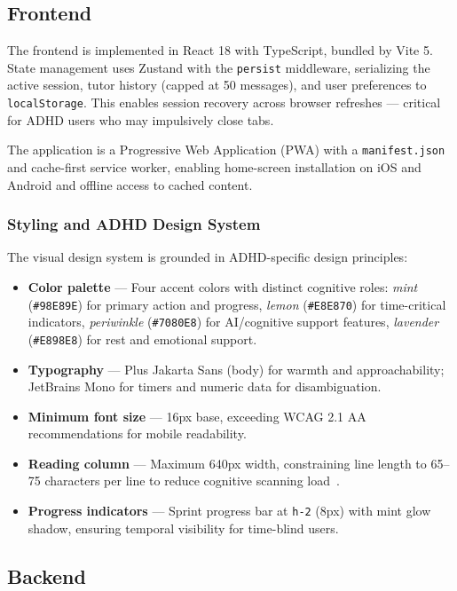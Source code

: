 \documentclass[conference]{IEEEtran}
\begin{document}
\subsection{Frontend}

The frontend is implemented in React 18 with TypeScript, bundled by Vite 5. State management uses Zustand with the \texttt{persist} middleware, serializing the active session, tutor history (capped at 50 messages), and user preferences to \texttt{localStorage}. This enables session recovery across browser refreshes — critical for ADHD users who may impulsively close tabs.

The application is a Progressive Web Application (PWA) with a \texttt{manifest.json} and cache-first service worker, enabling home-screen installation on iOS and Android and offline access to cached content.

\subsubsection{Styling and ADHD Design System}

The visual design system is grounded in ADHD-specific design principles:

\begin{itemize}
  \item \textbf{Color palette} — Four accent colors with distinct cognitive roles: \textit{mint} (\texttt{\#98E89E}) for primary action and progress, \textit{lemon} (\texttt{\#E8E870}) for time-critical indicators, \textit{periwinkle} (\texttt{\#7080E8}) for AI/cognitive support features, \textit{lavender} (\texttt{\#E898E8}) for rest and emotional support.
  \item \textbf{Typography} — Plus Jakarta Sans (body) for warmth and approachability; JetBrains Mono for timers and numeric data for disambiguation.
  \item \textbf{Minimum font size} — 16px base, exceeding WCAG 2.1 AA recommendations for mobile readability.
  \item \textbf{Reading column} — Maximum 640px width, constraining line length to 65--75 characters per line to reduce cognitive scanning load~\cite{dyson2004text}.
  \item \textbf{Progress indicators} — Sprint progress bar at \texttt{h-2} (8px) with mint glow shadow, ensuring temporal visibility for time-blind users.
\end{itemize}

\subsection{Backend}
\end{document}
